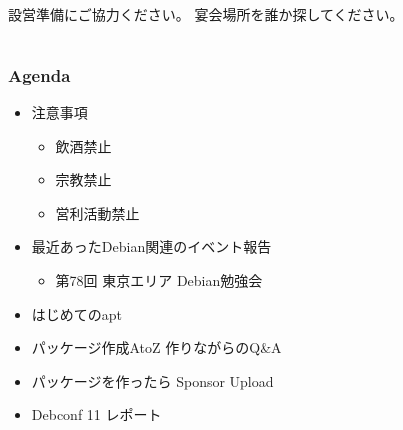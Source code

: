 \frame{\titlepage{}}


\begin{frame}{設営準備にご協力ください。}
宴会場所を誰か探してください。
\end{frame}


\section{}
\begin{frame}
 \frametitle{Agenda}
\begin{minipage}[t]{0.45\hsize}
  \begin{itemize}
  \item 注意事項
	\begin{itemize}
	 \item 飲酒禁止
	 \item 宗教禁止
	 \item 営利活動禁止
	\end{itemize}
   \item 最近あったDebian関連のイベント報告
	\begin{itemize}
	 \item 第78回 東京エリア Debian勉強会
	\end{itemize}
 \end{itemize}
\end{minipage} 
\begin{minipage}[t]{0.45\hsize}
 \begin{itemize}
   \item はじめてのapt\\
   \item パッケージ作成AtoZ 作りながらのQ\&A\\
   \item パッケージを作ったら Sponsor Upload\\
   \item Debconf 11 レポート\\
  \end{itemize}
\end{minipage}
\end{frame}

